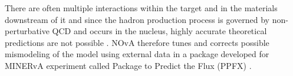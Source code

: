 


\iffalse
There are often multiple interactions within the target and in the materials downstream of it and since the hadron production process is governed by non-perturbative QCD and occurs in the nucleus, highly accurate theoretical predictions are not possible \cite{NuMIFlux.pdf,LEOFluxPredictionAtNuMI.pdf}. NOvA therefore tunes and corrects possible mismodeling of the model using external data in a package developed for MINERvA experiment called Package to Predict the Flux (PPFX) \cite{LEOFluxPredictionAtNuMI.pdf}.



